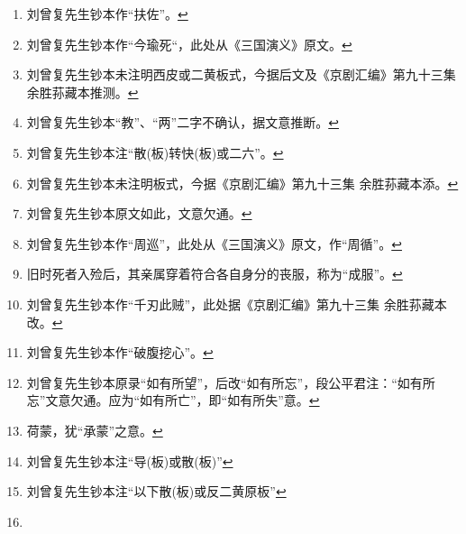 \begin{enumerate}
\item
  \leavevmode\hypertarget{fn640}{}%
  刘曾复先生钞本作``扶佐''。\protect\hyperlink{fnref640}{↩}
\item
  \leavevmode\hypertarget{fn641}{}%
  刘曾复先生钞本作``今瑜死``，此处从《三国演义》原文。\protect\hyperlink{fnref641}{↩}
\item
  \leavevmode\hypertarget{fn642}{}%
  刘曾复先生钞本未注明西皮或二黄板式，今据后文及《京剧汇编》第九十三集
  余胜荪藏本推测。\protect\hyperlink{fnref642}{↩}
\item
  \leavevmode\hypertarget{fn643}{}%
  刘曾复先生钞本``教''、``两''二字不确认，据文意推断。\protect\hyperlink{fnref643}{↩}
\item
  \leavevmode\hypertarget{fn644}{}%
  刘曾复先生钞本注``散(板)转快(板)或二六''。\protect\hyperlink{fnref644}{↩}
\item
  \leavevmode\hypertarget{fn645}{}%
  刘曾复先生钞本未注明板式，今据《京剧汇编》第九十三集
  余胜荪藏本添。\protect\hyperlink{fnref645}{↩}
\item
  \leavevmode\hypertarget{fn646}{}%
  刘曾复先生钞本原文如此，文意欠通。\protect\hyperlink{fnref646}{↩}
\item
  \leavevmode\hypertarget{fn647}{}%
  刘曾复先生钞本作``周巡''，此处从《三国演义》原文，作``周循''。\protect\hyperlink{fnref647}{↩}
\item
  \leavevmode\hypertarget{fn648}{}%
  旧时死者入殓后，其亲属穿着符合各自身分的丧服，称为``成服''。\protect\hyperlink{fnref648}{↩}
\item
  \leavevmode\hypertarget{fn649}{}%
  刘曾复先生钞本作``千刃此贼''，此处据《京剧汇编》第九十三集
  余胜荪藏本改。\protect\hyperlink{fnref649}{↩}
\item
  \leavevmode\hypertarget{fn650}{}%
  刘曾复先生钞本作``破腹挖心''。\protect\hyperlink{fnref650}{↩}
\item
  \leavevmode\hypertarget{fn651}{}%
  刘曾复先生钞本原录``如有所望''，后改``如有所忘''，段公平君注：``如有所忘''文意欠通。应为``如有所亡''，即``如有所失''意。\protect\hyperlink{fnref651}{↩}
\item
  \leavevmode\hypertarget{fn652}{}%
  荷蒙，犹``承蒙''之意。\protect\hyperlink{fnref652}{↩}
\item
  \leavevmode\hypertarget{fn653}{}%
  刘曾复先生钞本注``导(板)或散(板)''\protect\hyperlink{fnref653}{↩}
\item
  \leavevmode\hypertarget{fn654}{}%
  刘曾复先生钞本注``以下散(板)或反二黄原板''\protect\hyperlink{fnref654}{↩}
\item
  \leavevmode\hypertarget{fn655}{}%

\end{enumerate}
